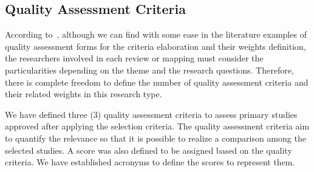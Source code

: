  
\subsection{Quality Assessment Criteria} \label{ssec_slm:qualityCriteria}

According to~\cite{Nakagawa:2017}, although we can find with some ease in the literature examples of quality assessment forms for the criteria elaboration and their weights definition, the researchers involved in each review or mapping must consider the particularities depending on the theme and the research questions.
Therefore, there is complete freedom to define the number of quality assessment criteria and their related weights in this research type.

We have defined three (3) quality assessment criteria to assess primary studies approved after applying the selection criteria.
The quality assessment criteria aim to quantify the relevance so that it is possible to realize a comparison among the selected studies.
A score was also defined to be assigned based on the quality criteria.
We have established acronyms to define the scores to represent them.

